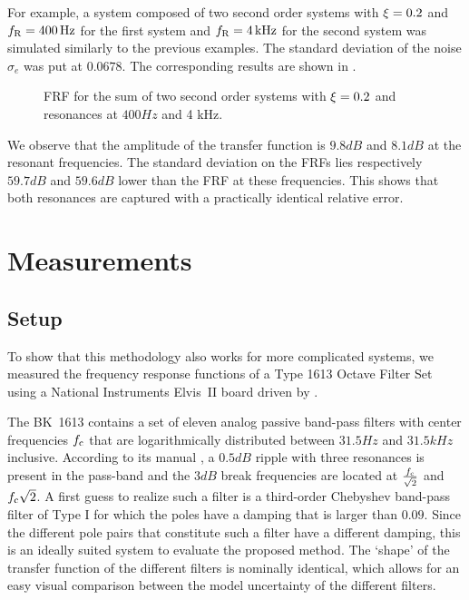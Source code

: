 For example, a system composed of two second order systems with $\xi = 0.2$ and $f_{\mathrm{R}} = 400 \,\mathrm{Hz}$ for the first system and $f_{\mathrm{R}}=4 \,\mathrm{kHz}$ for the second system was simulated similarly to the previous examples. The standard deviation of the noise $\sigma_e$ was put at $0.0678$. The corresponding results are  shown in .

\begin{figure}%
  \centering
  \setlength{}
  \setlength\figureheight{0.68\figurewidth}
  
  \caption{FRF for the sum of two second order systems with $\xi=0.2$ and
           resonances at $ 400 \unit{Hz}$ and 4 \unit{kHz}.}%
  \label{fig:sumSys}
\end{figure}

We observe that the amplitude of the transfer function is $9.8\unit{dB}$ and $8.1\unit{dB}$ at the resonant frequencies.
The standard deviation on the \glspl{FRF} lies respectively $59.7 \unit{dB}$ and $59.6 \unit{dB}$ lower than the \gls{FRF} at these frequencies. 
This shows that both resonances are captured with a practically identical relative error.
  
\section{Measurements} \label{sec:measurement}
  \subsection{Setup}
    To show that this methodology also works for more complicated systems, we measured the frequency response functions of a \bruelkjaer Type 1613 Octave Filter Set using a National Instruments Elvis~II board driven by \labview.
    
    The BK~1613 contains a set of eleven analog passive band-pass filters with center frequencies $f_{\mathrm{c}}$ that are logarithmically distributed between $31.5\unit{Hz}$ and $31.5\unit{kHz}$ inclusive.
    According to its manual \citep{datasheet_bk1613}, a $0.5\unit{dB}$ ripple with three resonances is present in the pass-band and the $3\unit{dB}$ break frequencies are located at $\frac{f_{\mathrm{c}}}{\sqrt{2}}$ and $f_{\mathrm{c}} \sqrt{2}$.
    A first guess to realize such a filter is a third-order Chebyshev band-pass filter of Type I \citep{Zverev1967} for which the poles have a damping that is larger than $0.09$.
    Since the different pole pairs that constitute such a filter have a different damping, this is an ideally suited system to evaluate the proposed method.
    The `shape' of the transfer function of the different filters is nominally identical, which allows for an easy visual comparison between the model uncertainty of the different filters.

